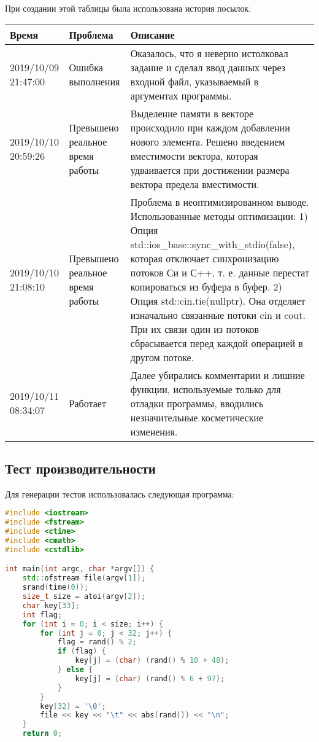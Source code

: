 \documentclass[12pt]{article}
\begin{document}
При создании этой таблицы была использована история посылок.
\begin{table}[!htb]
\begin{tabular}{|m{2cm}|m{3cm}|m{11cm}|}
\hline
Время & Проблема & Описание \\
\hline
2019/10/09 21:47:00 & Ошибка выполнения & Оказалось, что я неверно истолковал задание и сделал ввод данных через входной файл, указываемый в аргументах программы. \\
\hline
2019/10/10 20:59:26	& Превышено реальное время работы & Выделение памяти в векторе происходило при каждом добавлении нового элемента. Решено введением вместимости вектора, которая удваивается при достижении размера вектора предела вместимости. \\
\hline
2019/10/10 21:08:10	 & Превышено реальное время работы & Проблема в неоптимизированном выводе. Использованные методы оптимизации: 1) Опция std::ios\_base::sync\_with\_stdio(false), которая отключает синхронизацию потоков Си и С++, т. е. данные перестат копироваться из буфера в буфер. 2) Опция std::cin.tie(nullptr). Она отделяет изначально связанные потоки cin и cout. При их связи один из потоков сбрасывается перед каждой операцией в другом потоке. \\
\hline

2019/10/11 08:34:07	 & Работает & Далее убирались комментарии и лишние функции, используемые только для отладки программы, вводились незначительные косметические изменения. \\
\hline
\end{tabular}
\end{table}

\subsection*{Тест производительности}

Для генерации тестов использовалась следующая программа:
\begin{lstlisting}[language=C++]
#include <iostream>
#include <fstream>
#include <ctime>
#include <cmath>
#include <cstdlib>

int main(int argc, char *argv[]) {
    std::ofstream file(argv[1]);
    srand(time(0));
    size_t size = atoi(argv[2]);
    char key[33];
    int flag;
    for (int i = 0; i < size; i++) {
        for (int j = 0; j < 32; j++) {
            flag = rand() % 2;
            if (flag) {
                key[j] = (char) (rand() % 10 + 48);
            } else {
                key[j] = (char) (rand() % 6 + 97);
            }
        }
        key[32] = '\0';
        file << key << "\t" << abs(rand()) << "\n";
    }
    return 0;
\end{lstlisting}
\end{document}
